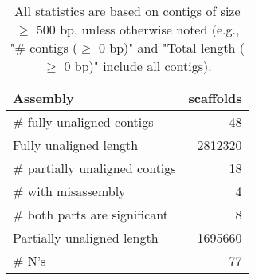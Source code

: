 \documentclass[12pt,a4paper]{article}
\begin{document}
\begin{table}[ht]
\begin{center}
\caption{All statistics are based on contigs of size $\geq$ 500 bp, unless otherwise noted (e.g., "\# contigs ($\geq$ 0 bp)" and "Total length ($\geq$ 0 bp)" include all contigs).}
\begin{tabular}{|l*{1}{|r}|}
\hline
Assembly & scaffolds \\ \hline
\# fully unaligned contigs & 48 \\ \hline
Fully unaligned length & 2812320 \\ \hline
\# partially unaligned contigs & 18 \\ \hline
\hspace{5mm}\# with misassembly & 4 \\ \hline
\hspace{5mm}\# both parts are significant & 8 \\ \hline
Partially unaligned length & 1695660 \\ \hline
\# N's & 77 \\ \hline
\end{tabular}
\end{center}
\end{table}
\end{document}
